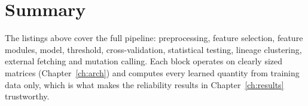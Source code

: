 \documentclass[../main.tex]{subfiles}
\begin{document}
\section{Summary}

The listings above cover the full pipeline: preprocessing, feature selection, feature modules, model, threshold, cross-validation, statistical testing, lineage clustering, external fetching and mutation calling. Each block operates on clearly sized matrices (Chapter~\ref{ch:arch}) and computes every learned quantity from training data only, which is what makes the reliability results in Chapter~\ref{ch:results} trustworthy.
\end{document}
